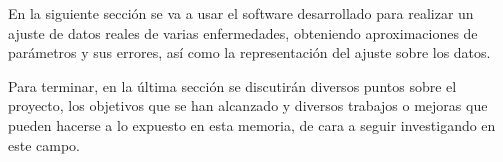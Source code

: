 En la siguiente sección se va a usar el software desarrollado para realizar un ajuste de datos reales de varias enfermedades, obteniendo aproximaciones de parámetros y sus errores, así como la representación del ajuste sobre los datos.

Para terminar, en la última sección se discutirán diversos puntos sobre el proyecto, los objetivos que se han alcanzado y diversos trabajos o mejoras que pueden hacerse a lo expuesto en esta memoria, de cara a seguir investigando en este campo.


